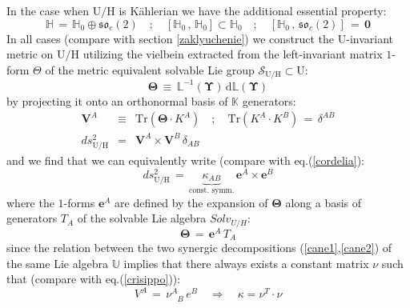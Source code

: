 \documentclass[10pt,a4paper]{article}
\newcommand{\so}{\mathfrak{so}}
\begin{document}
\par
In the case when $\mathrm{U/H}$ is K\"ahlerian we have the additional essential property:
\begin{equation}\label{essenziando}
  \mathbb{H} \, = \, \mathbb{H}_0 \oplus \so_c(2) \quad ; \quad \left[\mathbb{H}_0 \, , \, \mathbb{H}_0 \right] \subset \mathbb{H}_0 \quad ; \quad \left[\mathbb{H}_0 \, , \, \so_c(2) \right] \, = \, \mathbf{0}
\end{equation}
In all cases (compare with section \ref{zaklyuchenie}) we construct the $\mathrm{U}$-invariant metric on $\mathrm{U/H}$ utilizing the vielbein extracted from the left-invariant matrix $1$-form $\Theta$ of the metric equivalent solvable Lie group $\mathcal{S}_{\mathrm{U/H}} \subset \mathrm{U}$:
\begin{equation}\label{tettona}
  \boldsymbol{\Theta} \, \equiv \, \mathbb{L}^{-1}(\boldsymbol{\Upsilon}) \, \mathrm{d}\mathbb{L}(\boldsymbol{\Upsilon})
\end{equation}
by projecting it onto an orthonormal basis of $\mathbb{K}$ generators:
\begin{eqnarray}\label{congelato}
  \mathbf{V}^A & \equiv & \text{Tr}\left(\boldsymbol{\Theta}\cdot K^A\right) \quad ; \quad \text{Tr}(K^A\cdot K^B) \, = \, \delta^{AB}\nonumber\\
  ds_{\mathrm{U/H}}^2 &=& \mathbf{V}^A \times \mathbf{V}^B \, \delta_{AB}
\end{eqnarray}
and we find that we can equivalently write (compare with eq.(\ref{cordelia}):
\begin{equation}\label{critta}
  ds_{\mathrm{U/H}}^2 \, = \, \underbrace{\kappa_{AB}}_{\text{const. symm.}} \, \mathbf{e}^A \times \mathbf{e}^B
\end{equation}
where the $1$-forms $\mathbf{e}^A$ are defined by the expansion of $\boldsymbol{\Theta}$ along a basis of generators
$T_A$ of the solvable Lie algebra $Solv_{U/H}$:
\begin{equation}\label{crucifige}
  \boldsymbol{\Theta} \, = \, \mathbf{e}^A \, T_A
\end{equation}
since the relation between the two synergic decompositions (\ref{cane1},\ref{cane2}) of the same  Lie algebra $\mathbb{U}$ implies that there always exists a constant matrix $\nu$ such that (compare with eq.(\ref{crisippo})):
\begin{equation}\label{ermenegildo}
  V^A \, = \, \nu^A_{\phantom{A}B} \, e^B \quad \Rightarrow \quad \kappa = \nu^T \cdot \nu
\end{equation}
\par
\end{document}
